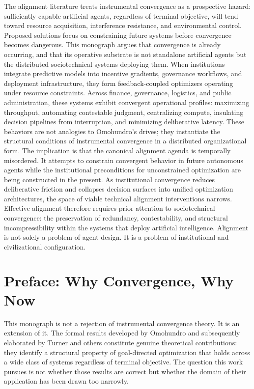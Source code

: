 \documentclass[12pt, oneside]{book}
\theoremstyle{plain}
\theoremstyle{definition}
\theoremstyle{remark}
\theoremstyle{definition}
\begin{document}
The alignment literature treats instrumental convergence as a prospective hazard:
sufficiently capable artificial agents, regardless of terminal objective, will tend
toward resource acquisition, interference resistance, and environmental control.
Proposed solutions focus on constraining future systems before convergence becomes
dangerous. This monograph argues that convergence is already occurring, and that
its operative substrate is not standalone artificial agents but the distributed
sociotechnical systems deploying them. When institutions integrate predictive models
into incentive gradients, governance workflows, and deployment infrastructure, they
form feedback-coupled optimizers operating under resource constraints. Across finance,
governance, logistics, and public administration, these systems exhibit convergent
operational profiles: maximizing throughput, automating contestable judgment,
centralizing compute, insulating decision pipelines from interruption, and minimizing
deliberative latency. These behaviors are not analogies to Omohundro's drives; they
instantiate the structural conditions of instrumental convergence in a distributed
organizational form. The implication is that the canonical alignment agenda is
temporally misordered. It attempts to constrain convergent behavior in future
autonomous agents while the institutional preconditions for unconstrained optimization
are being constructed in the present. As institutional convergence reduces deliberative
friction and collapses decision surfaces into unified optimization architectures, the
space of viable technical alignment interventions narrows. Effective alignment therefore
requires prior attention to sociotechnical convergence: the preservation of redundancy,
contestability, and structural incompressibility within the systems that deploy
artificial intelligence. Alignment is not solely a problem of agent design. It is a
problem of institutional and civilizational configuration.

\clearpage

\chapter*{Preface: Why Convergence, Why Now}

This monograph is not a rejection of instrumental convergence theory. It is an
extension of it. The formal results developed by Omohundro and subsequently
elaborated by Turner and others constitute genuine theoretical contributions: they
identify a structural property of goal-directed optimization that holds across a
wide class of systems regardless of terminal objective. The question this work
pursues is not whether those results are correct but whether the domain of their
application has been drawn too narrowly.
\end{document}

